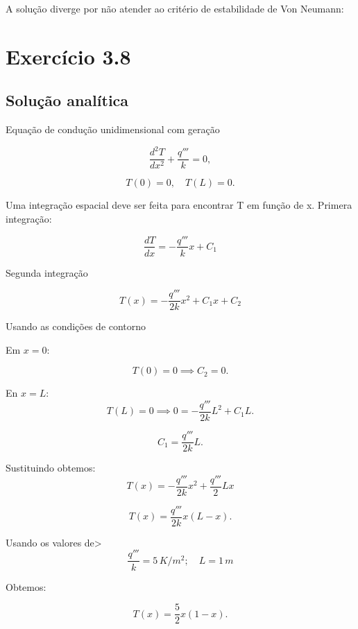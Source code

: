 \documentclass[]{article}
\begin{document}
A solução diverge por não atender ao critério de estabilidade de Von Neumann:

\section*{Exercício 3.8}

\subsection*{Solução analítica}

Equação de condução unidimensional com geração

\begin{equation}
	\frac{d^2 T}{dx^2} + \frac{q'''}{k} = 0,
\end{equation}

\begin{equation}
	T(0) = 0, \quad T(L) = 0.
\end{equation}


Uma integração espacial deve ser feita para encontrar T em função de x. Primera integração:

\begin{equation}
	\frac{dT}{dx} = -\frac{q'''}{k}x + C_1
\end{equation}


Segunda integração 

\begin{equation}
	T(x) = -\frac{q'''}{2k}x^2 + C_1x + C_2
\end{equation}


Usando as condições de contorno

Em \(x = 0\):

\[
T(0) = 0 \implies C_2 = 0.
\]

En \(x = L\):
\[
T(L) = 0 \implies 0 = -\frac{q'''}{2k}L^2 + C_1L.
\]

\[
C_1 = \frac{q'''}{2k}L.
\]

Sustituindo obtemos:
\begin{equation}
	T(x) = -\frac{q'''}{2k}x^2 + \frac{q'''}{2}Lx
\end{equation}

\begin{equation}
	T(x) = \frac{q'''}{2k}x(L - x).
\end{equation}


Usando os valores de>
\[
\frac{q'''}{k} = 5 \,{K/m^{2}} ; \quad L = 1 \, m
\]

Obtemos:

\begin{equation}
	T(x) = \frac{5}{2}x(1 - x).
\end{equation}
\end{document}

